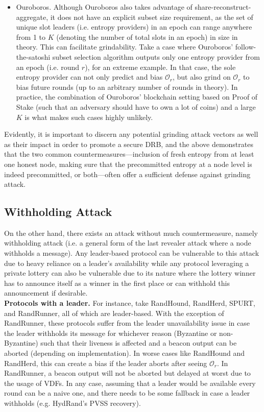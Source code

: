 \documentclass[letterpaper,twocolumn,10pt]{article}
\theoremstyle{definition}
\theoremstyle{remark}
\begin{document}
\begin{itemize}
\item Ouroboros. Although Ouroboros also takes advantage of share-reconstruct-aggregate, it does not have an explicit subset size requirement, as the set of unique slot leaders (i.e. entropy providers) in an epoch can range anywhere from 1 to $K$ (denoting the number of total slots in an epoch) in size in theory. This can facilitate grindability. Take a case where Ouroboros' follow-the-satoshi subset selection algorithm outputs only one entropy provider from an epoch (i.e. round $r$), for an extreme example. In that case, the sole entropy provider can not only predict and bias $\mathcal{O}_r$, but also grind on $\mathcal{O}_r$ to bias future rounds (up to an arbitrary number of rounds in theory). In practice, the combination of Ouroboros' blockchain setting based on Proof of Stake (such that an adversary should have to own a lot of coins) and a large $K$ is what makes such cases highly unlikely.
\end{itemize}

Evidently, it is important to discern any potential grinding attack vectors as well as their impact in order to promote a secure DRB, and the above demonstrates that the two common countermeasures---inclusion of fresh entropy from at least one honest node, making sure that the precommitted entropy at a node level is indeed precommitted, or both---often offer a sufficient defense against grinding attack.

\subsection{Withholding Attack}
On the other hand, there exists an attack without much countermeasure, namely withholding attack (i.e. a general form of the last revealer attack where a node withholds a message). Any leader-based protocol can be vulnerable to this attack due to heavy reliance on a leader's availability while any protocol leveraging a private lottery can also be vulnerable due to its nature where the lottery winner has to announce itself as a winner in the first place or can withhold this announcement if desirable.\\

\noindent\textbf{Protocols with a leader.} For instance, take RandHound, RandHerd, SPURT, and RandRunner, all of which are leader-based. With the exception of RandRunner, these protocols suffer from the leader unavailability issue in case the leader withholds its message for whichever reason (Byzantine or non-Byzantine) such that their liveness is affected and a beacon output can be aborted (depending on implementation). In worse cases like RandHound and RandHerd, this can create a bias if the leader aborts after seeing $\mathcal{O}_r$. In RandRunner, a beacon output will not be aborted but delayed at worst due to the usage of VDFs. In any case, assuming that a leader would be available every round can be a naive one, and there needs to be some fallback in case a leader withholds (e.g. HydRand's PVSS recovery).\\
\end{document}
